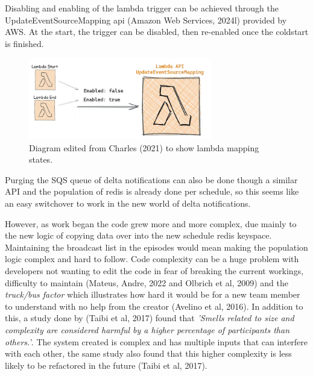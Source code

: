   Disabling and enabling of the lambda trigger can be achieved through the UpdateEventSourceMapping api (Amazon Web Services, 2024l) provided by AWS. 
  At the start, the trigger can be disabled, then re-enabled once the coldstart is finished.

  \begin{figure}[H]
    \centering
    \includegraphics[width=8cm]{assets/lambdaMapping.png}
    \caption{Diagram edited from Charles (2021) to show lambda mapping states.}
    \label{fig:lambdaMapping}
  \end{figure}

  Purging the SQS queue of delta notifications can also be done though a similar API and the population of redis is already done per schedule, so 
  this seems like an easy switchover to work in the new world of delta notifications.

  However, as work began the code grew more and more complex, due mainly to the new logic of copying data over into the new schedule redis keyspace.
  Maintaining the broadcast list in the episodes would mean making the population logic complex and hard to follow. Code complexity can be a huge 
  problem with developers not wanting to edit the code in fear of breaking the current workings, difficulty to maintain 
  (Mateus, Andre, 2022 and Olbrich et al, 2009) and the \textit{truck/bus factor} which illustrates how hard it would be for a new team member to 
  understand with no help from the creator (Avelino et al, 2016). In addition to this, a study done by (Taibi et al, 2017) found that 
  \textit{'Smells related to size and complexity are considered harmful by a higher percentage of participants than others.'}. The system created is 
  complex and has multiple inputs that can interfere with each other, the same study also found that this higher complexity is less likely to be 
  refactored in the future (Taibi et al, 2017).

